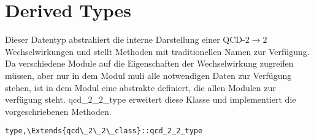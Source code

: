 \section{Derived Types}
Dieser Datentyp abstrahiert die interne Darstellung einer QCD-$2\rightarrow 2$ Wechselwirkungen und stellt Methoden mit traditionellen Namen zur Verfügung. Da verschiedene Module auf die Eigenschaften der Wechselwirkung zugreifen müssen, aber nur in dem Modul muli alle notwendigen Daten zur Verfügung stehen, ist in dem Modul  eine abstrakte  definiert, die allen Modulen zur verfügung steht. qcd\_2\_2\_type erweitert diese Klasse und implementiert die vorgeschriebenen Methoden.
\begin{Verbatim}
type,\Extends{qcd\_2\_2\_class}::qcd_2_2_type
\end{Verbatim}
